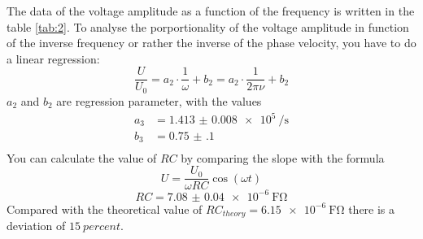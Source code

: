 The data of the voltage amplitude as a function of the frequency is written
in the table \ref{tab:2}. To analyse the porportionality of the voltage amplitude
in function of the inverse frequency or rather the inverse of the phase velocity,
you have to do a linear regression:
\begin{equation*}
  \frac{U}{U_0} = a_2 \cdot \frac{1}{\omega} + b_2 = a_2 \cdot \frac{1}{2 \pi \nu} + b_2
\end{equation*}
$a_2$ and $b_2$ are regression parameter, with the values
\begin{align*}
  a_3 &= \SI{1.413(8)e5}{\per\second} \\
  b_3 &= \SI{0.75(10)}{} \\
\end{align*}
You can calculate the value of $RC$ by comparing the slope with the formula
\begin{equation}
  \label{eq:1}
  U = \frac{U_0}{\omega R C} \cos{(\omega t)}
\end{equation}
\begin{equation*}
  RC = \SI{7.08(4)e-6}{\farad\ohm}
\end{equation*}
Compared with the theoretical value of $RC_{theory}= \SI{6.15e-6}{\farad\ohm}$ there is a
deviation of $\SI{15}{percent}$.
